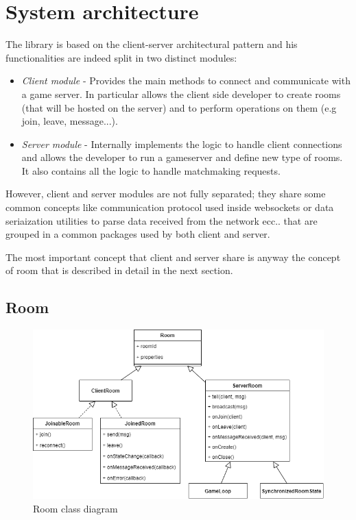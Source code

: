 \chapter{System architecture}
The library is based on the client-server architectural pattern and his functionalities are indeed split in two distinct modules: 
\begin{itemize}
	\item \textit{Client module} - Provides the main methods to connect and communicate with a game server. In particular allows the client side developer to create rooms (that will be hosted on the server) and to perform operations on them (e.g join, leave, message...).
	\item \textit{Server module} - Internally implements the logic to handle client connections and allows the developer to run a gameserver and define new type of rooms. It also contains all the logic to handle matchmaking requests.
\end{itemize}

However, client and server modules are not fully separated; they share some common concepts like communication protocol used inside websockets or data seriaization utilities to parse data received from the network ecc.. that are grouped in a common packages used by both client and server.

The most important concept that client and server share is anyway the concept of room that is described in detail in the next section. 

\section{Room}

\begin{figure}[H]
	\includegraphics[scale=0.7]{images/3-architecture/room-class-2.png}
	\caption{Room class diagram}
	\label{fig:room_classes}
\end{figure}

